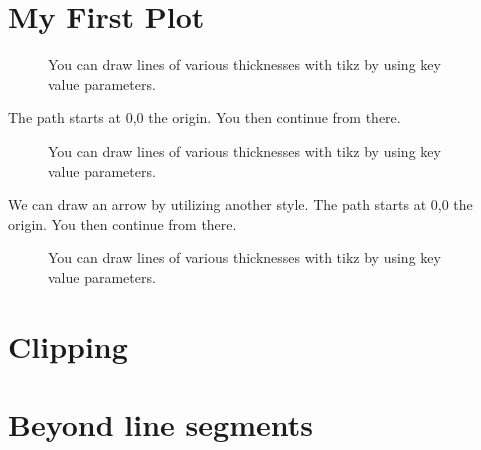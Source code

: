 \section{My First Plot}

\begin{figure}
\caption{You can draw lines of various thicknesses with tikz by using key value parameters.}
\end{figure}

The path starts at 0,0 the origin. You then continue from there.
\begin{figure}
\caption{You can draw lines of various thicknesses with tikz by using key value parameters.}
\end{figure}

We can draw an arrow by utilizing another style.
The path starts at 0,0 the origin. You then continue from there.
\begin{figure}
\caption{You can draw lines of various thicknesses with tikz by using key value parameters.}
\end{figure}


\section{Clipping}






\section{Beyond line segments}


